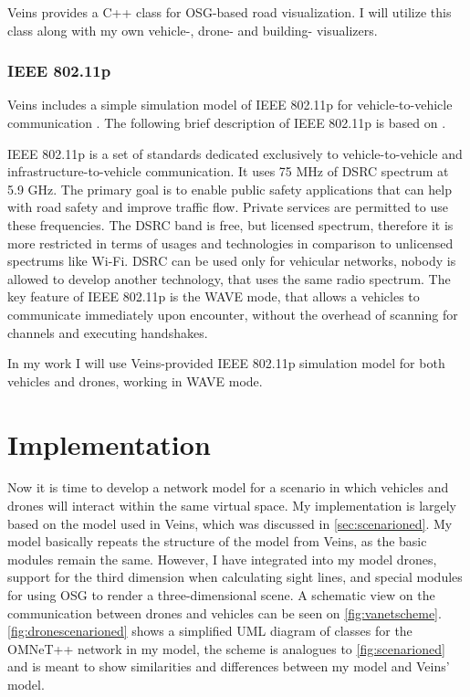 \documentclass[]{nsm-thesis}
\begin{document}
Veins provides a C++ class for \ac{OSG}-based road visualization. I will utilize this class along with my own vehicle-, drone- and building- visualizers.

\subsection{IEEE 802.11p}
Veins includes a simple simulation model of IEEE 802.11p for vehicle-to-vehicle communication \cite[Page~216]{Sommer2019}. The following brief description of IEEE 802.11p is based on \textcite{jiang2008ieee}.

IEEE 802.11p is a set of standards dedicated exclusively to vehicle-to-vehicle and infrastructure-to-vehicle communication. It uses 75 MHz of \ac{DSRC} spectrum at 5.9 GHz. The primary goal is to enable public safety applications that can help with road safety and improve traffic flow. Private services are permitted to use these frequencies. The \ac{DSRC} band is free, but licensed spectrum, therefore it is more restricted in terms of usages and technologies in comparison to unlicensed spectrums like Wi-Fi. \ac{DSRC} can be used only for vehicular networks, nobody is allowed to develop another technology, that uses the same radio spectrum. The key feature of IEEE 802.11p is the WAVE mode, that allows a vehicles to communicate immediately upon encounter, without the overhead of scanning for channels and executing handshakes. 

In my work I will use Veins-provided IEEE 802.11p simulation model for both vehicles and drones, working in WAVE mode.

\chapter{Implementation}

Now it is time to develop a network model for a scenario in which vehicles and drones will interact within the same virtual space. My implementation is largely based on the model used in Veins, which was discussed in \cref{sec:scenarioned}. My model basically repeats the structure of the model from Veins, as the basic modules remain the same. However, I have integrated into my model drones, support for the third dimension when calculating sight lines, and special modules for using OSG to render a three-dimensional scene. A schematic view on the communication between drones and vehicles can be seen on \cref{fig:vanetscheme}. \cref{fig:dronescenarioned} shows a simplified UML diagram of classes for the OMNeT++ network in my model, the scheme is analogues to \cref{fig:scenarioned} and is meant to show similarities and differences between my model and Veins' model.
\end{document}
